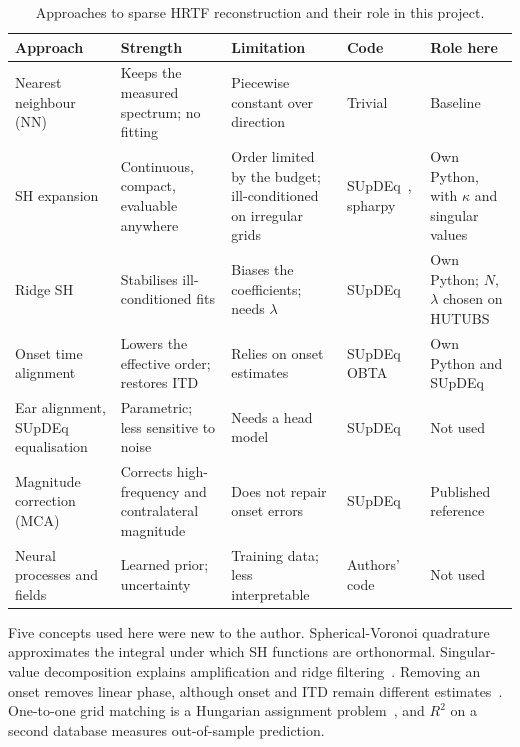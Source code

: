 \documentclass[11pt,a4paper]{article}
\begin{document}
\begin{table}[t]
\centering
\caption{Approaches to sparse HRTF reconstruction and their role in this project.}
\label{tab:approaches}
\footnotesize
\setlength{\tabcolsep}{3.5pt}
\begin{tabularx}{\linewidth}{@{}>{\raggedright\arraybackslash}p{2.55cm}>{\raggedright\arraybackslash}X>{\raggedright\arraybackslash}X>{\raggedright\arraybackslash}p{2.25cm}>{\raggedright\arraybackslash}p{2.5cm}@{}}
\toprule
Approach & Strength & Limitation & Code & Role here \\
\midrule
Nearest neighbour (NN) & Keeps the measured spectrum; no fitting & Piecewise constant over direction & Trivial & Baseline \\
SH expansion~\cite{evans1998,romigh2015} & Continuous, compact, evaluable anywhere & Order limited by the budget; ill-conditioned on irregular grids & SUpDEq~\cite{supdeq}, spharpy~\cite{spharpy} & Own Python, with $\kappa$ and singular values \\
Ridge SH~\cite{zotkin2009,bau2022} & Stabilises ill-conditioned fits & Biases the coefficients; needs $\lambda$ & SUpDEq & Own Python; $N$, $\lambda$ chosen on HUTUBS \\
Onset time alignment~\cite{evans1998,arend2021} & Lowers the effective order; restores ITD & Relies on onset estimates & SUpDEq OBTA & Own Python and SUpDEq \\
Ear alignment, SUpDEq equalisation~\cite{benhur2019,porschmann2019} & Parametric; less sensitive to noise & Needs a head model & SUpDEq & Not used \\
Magnitude correction (MCA)~\cite{arend2023} & Corrects high-frequency and contralateral magnitude & Does not repair onset errors & SUpDEq & Published reference \\
Neural processes and fields~\cite{thuillier2024,zhang2023} & Learned prior; uncertainty & Training data; less interpretable & Authors' code & Not used \\
\bottomrule
\end{tabularx}
\end{table}

Five concepts used here were new to the author. Spherical-Voronoi quadrature approximates the integral under which SH functions are orthonormal. Singular-value decomposition explains amplification and ridge filtering~\cite{hansen1998}. Removing an onset removes linear phase, although onset and ITD remain different estimates~\cite{katz2014}. One-to-one grid matching is a Hungarian assignment problem~\cite{kuhn1955}, and $R^2$ on a second database measures out-of-sample prediction.
\end{document}
